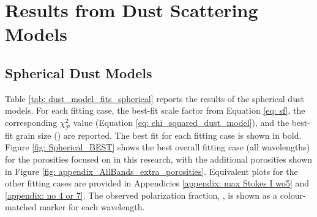 \section{Results from Dust Scattering Models}
\label{sec: ch5_DustModelResults}
\subsection{Spherical Dust Models}
\label{sec: chapter5_spherical_dust_model_results}
Table \ref{tab: dust_model_fits_spherical} reports the results of the spherical dust models. For each fitting case, the best-fit scale factor from Equation \ref{eq: sf}, the corresponding $\chi_\mathcal{P}^2$ value (Equation \ref{eq: chi_squared_dust_model}), and the best-fit grain size (\amaxbestNS) are reported. The best fit for each fitting case is shown in bold. Figure \ref{fig: Spherical_BEST} shows the best overall fitting case (all wavelengths) for the porosities focused on in this research, with the additional porosities shown in Figure \ref{fig: appendix_AllBands_extra_porosities}. Equivalent plots for the other fitting cases are provided in Appendicies \ref{appendix: max Stokes I wo5} and \ref{appendix: no 4 or 7}. The observed polarization fraction, \POLFsiNS, is shown as a colour-matched marker for each wavelength. 







